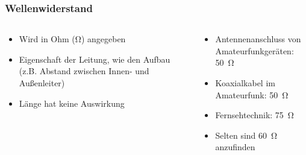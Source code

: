 \begin{frame}
\frametitle{Wellenwiderstand}
\begin{columns}
    \begin{column}{0.48\textwidth}
    \begin{itemize}
  \item Wird in Ohm (Ω) angegeben
  \item Eigenschaft der Leitung, wie den Aufbau (z.B. Abstand zwischen Innen- und Außenleiter)
  \item Länge hat keine Auswirkung
  \end{itemize}

    \end{column}
   \begin{column}{0.48\textwidth}
       
    \pause
    \begin{itemize}
  \item Antennenanschluss von Amateurfunkgeräten: 50~Ω
  \item Koaxialkabel im Amateurfunk: 50~Ω
  \item Fernsehtechnik: 75~Ω
  \item Selten sind 60~Ω anzufinden
  \end{itemize}



   \end{column}
\end{columns}

\end{frame}

\begin{frame}
\end{frame}%
